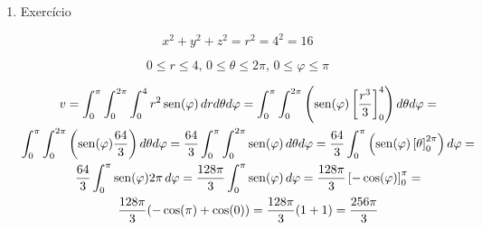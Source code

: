 \begin{enumerate}
	\item Exercício
	
	\begin{equation*}
		x^2 + y^2+ z^2 = r^2 = 4^2 = 16
	\end{equation*}
	
	
	\begin{equation*}
		0 \leq r \leq 4,\, 0 \leq \theta \leq 2\pi,\, 0 \leq \varphi \leq \pi
	\end{equation*}
	
	\begin{gather*}
		v = \int_0^{\pi} \int_0^{2\pi} \int_0^4 r^2\operatorname{sen}(\varphi)\, dr d\theta d\varphi = \int_0^{\pi} \int_0^{2\pi}\left(\operatorname{sen}(\varphi)\left[\dfrac{r^3}{3}\right]_0^4\right)d\theta d\varphi =\\ \int_0^{\pi} \int_0^{2\pi}\left(\operatorname{sen}(\varphi)\dfrac{64}{3}\right)d\theta d\varphi = \dfrac{64}{3}\int_0^{\pi} \int_0^{2\pi}\operatorname{sen}(\varphi)\, d\theta d\varphi = \dfrac{64}{3} \int_0^{\pi} \left(\operatorname{sen}(\varphi)\left[\theta\right]_0^{2\pi}\right)d\varphi =\\ \dfrac{64}{3} \int_0^{\pi} \operatorname{sen}(\varphi) 2\pi\, d\varphi = \dfrac{128\pi}{3} \int_0^{\pi} \operatorname{sen}(\varphi)\, d\varphi = \dfrac{128\pi}{3} \left[-\cos(\varphi)\right]_0^{\pi} =\\ \dfrac{128\pi}{3} (-\cos(\pi) + \cos(0)) = \dfrac{128\pi}{3} (1 + 1) = \dfrac{256\pi}{3}
	\end{gather*}
\end{enumerate}